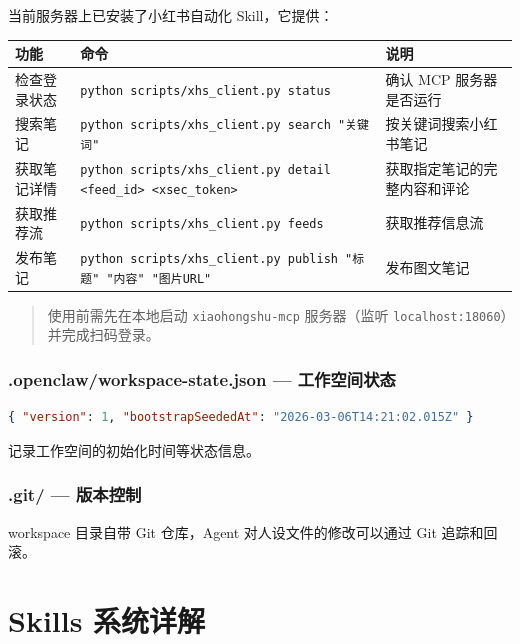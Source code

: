当前服务器上已安装了小红书自动化 Skill，它提供：

\begin{table}[h]
\centering
\small
\begin{tabular}{|l|l|l|}
\hline
功能 & 命令 & 说明 \\
\hline
检查登录状态 & \texttt{python scripts/xhs\_client.py status} & 确认 MCP 服务器是否运行 \\
\hline
搜索笔记 & \texttt{python scripts/xhs\_client.py search "关键词"} & 按关键词搜索小红书笔记 \\
\hline
获取笔记详情 & \texttt{python scripts/xhs\_client.py detail <feed\_id> <xsec\_token>} & 获取指定笔记的完整内容和评论 \\
\hline
获取推荐流 & \texttt{python scripts/xhs\_client.py feeds} & 获取推荐信息流 \\
\hline
发布笔记 & \texttt{python scripts/xhs\_client.py publish "标题" "内容" "图片URL"} & 发布图文笔记 \\
\hline
\end{tabular}
\end{table}

\begin{quote}
使用前需先在本地启动 \texttt{xiaohongshu-mcp} 服务器（监听 \texttt{localhost:18060}）并完成扫码登录。
\end{quote}

\subsubsection{.openclaw/workspace-state.json --- 工作空间状态}


\begin{lstlisting}[language=json]
{ "version": 1, "bootstrapSeededAt": "2026-03-06T14:21:02.015Z" }
\end{lstlisting}

记录工作空间的初始化时间等状态信息。

\subsubsection{.git/ --- 版本控制}


workspace 目录自带 Git 仓库，Agent 对人设文件的修改可以通过 Git 追踪和回滚。

\hrulefill

\section{Skills 系统详解}


